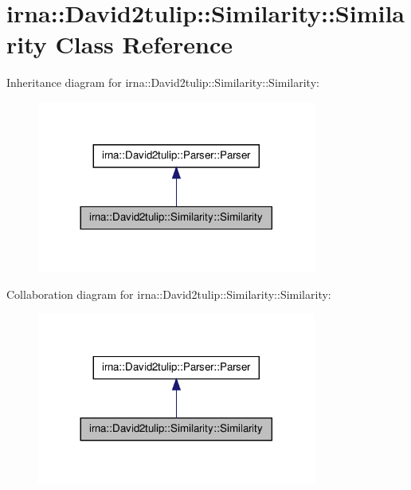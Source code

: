 \hypertarget{classirna_1_1David2tulip_1_1Similarity_1_1Similarity}{
\section{irna\-:\-:\-David2tulip\-:\-:\-Similarity\-:\-:\-Similarity \-Class \-Reference}
\label{classirna_1_1David2tulip_1_1Similarity_1_1Similarity}
}


\-Inheritance diagram for irna\-:\-:\-David2tulip\-:\-:\-Similarity\-:\-:\-Similarity\-:\nopagebreak
\begin{figure}[H]
\begin{center}
\leavevmode
\includegraphics[width=260pt]{classirna_1_1David2tulip_1_1Similarity_1_1Similarity__inherit__graph}
\end{center}
\end{figure}


\-Collaboration diagram for irna\-:\-:\-David2tulip\-:\-:\-Similarity\-:\-:\-Similarity\-:\nopagebreak
\begin{figure}[H]
\begin{center}
\leavevmode
\includegraphics[width=260pt]{classirna_1_1David2tulip_1_1Similarity_1_1Similarity__coll__graph}
\end{center}
\end{figure}
